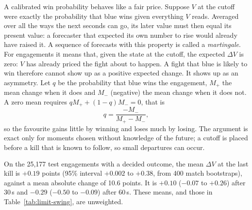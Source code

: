 A calibrated win probability behaves like a fair price. Suppose $V$ at the cutoff were exactly the
probability that blue wins given everything $V$ reads. Averaged over all the ways the next seconds can
go, its later value must then equal its present value: a forecaster that expected its own number to rise
would already have raised it. A sequence of forecasts with this property is called a \emph{martingale}.
For engagements it means that, given the state at the cutoff, the expected $\Delta V$ is zero: $V$ has
already priced the fight about to happen. A fight that blue is likely to win therefore cannot show up as
a positive expected change. It shows up as an asymmetry. Let $q$ be the probability that blue wins the
engagement, $M_+$ the mean change when it does and $M_-$ (negative) the mean change when it does not. A
zero mean requires $q M_+ + (1-q) M_- = 0$, that is
\begin{equation}
q = \frac{-M_-}{M_+ - M_-},
\end{equation}
so the favourite gains little by winning and loses much by losing. The argument is exact only for moments
chosen without knowledge of the future; a cutoff is placed before a kill that is known to follow, so small
departures can occur.

On the 25,177 test engagements with a decided outcome, the mean $\Delta V$ at the last kill is $+0.19$
points (95\% interval $+0.002$ to $+0.38$, from 400 match bootstraps), against a mean absolute change of
10.6 points. It is $+0.10$ ($-0.07$ to $+0.26$) after 30\,s and $-0.29$ ($-0.50$ to $-0.09$) after
60\,s. These means, and those in Table~\ref{tab:limit-swing}, are unweighted.

